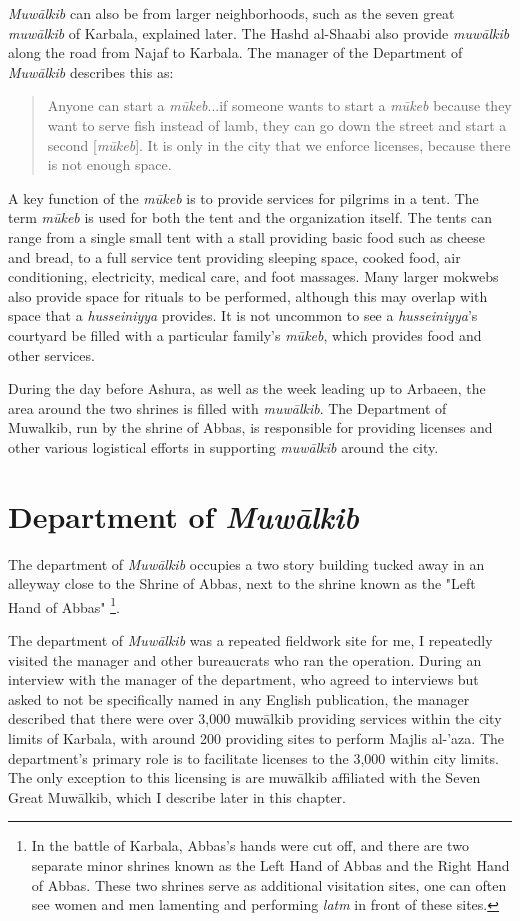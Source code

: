 \emph{Muwālkib} can also be from larger neighborhoods, such as the seven great \emph{muwālkib} of Karbala, explained later. The Hashd al-Shaabi also provide \emph{muwālkib} along the road from Najaf to Karbala. The manager of the Department of \emph{Muwālkib} describes this as:

\begin{quote}
    Anyone can start a \emph{mūkeb}...if someone wants to start a \emph{mūkeb} because they want to serve fish instead of lamb, they can go down the street and start a second [\emph{mūkeb}]. It is only in the city that we enforce licenses, because there is not enough space.
\end{quote}

A key function of the \emph{mūkeb} is to provide services for pilgrims in a tent. The term \emph{mūkeb} is used for both the tent and the organization itself. The tents can range from a single small tent with a stall providing basic food such as cheese and bread, to a full service tent providing sleeping space, cooked food, air conditioning, electricity, medical care, and foot massages. Many larger mokwebs also provide space for rituals to be performed, although this may overlap with space that a \emph{husseiniyya} provides. It is not uncommon to see a \emph{husseiniyya}'s courtyard be filled with a particular family's \emph{mūkeb}, which provides food and other services. 

During the day before Ashura, as well as the week leading up to Arbaeen, the area around the two shrines is filled with \emph{muwālkib}. The Department of Muwalkib, run by the shrine of Abbas, is responsible for providing licenses and other various logistical efforts in supporting \emph{muwālkib} around the city.

\section{Department of \emph{Muwālkib}}
The department of \emph{Muwālkib} occupies a two story building tucked away in an alleyway close to the Shrine of Abbas, next to the shrine known as the "Left Hand of Abbas" \footnote{In the battle of Karbala, Abbas's hands were cut off, and there are two separate minor shrines known as the Left Hand of Abbas and the Right Hand of Abbas. These two shrines serve as additional visitation sites, one can often see women and men lamenting and performing \emph{latm} in front of these sites.}. 

The department of \emph{Muwālkib} was a repeated fieldwork site for me, I repeatedly visited the manager and other bureaucrats who ran the operation. During an interview with the manager of the department, who agreed to interviews but asked to not be specifically named in any English publication, the manager described that there were over 3,000 muwālkib providing services within the city limits of Karbala, with around 200 providing sites to perform Majlis al-'aza. The department's primary role is to facilitate licenses to the 3,000 within city limits. The only exception to this licensing is are muwālkib affiliated with the Seven Great Muwālkib, which I describe later in this chapter. 

